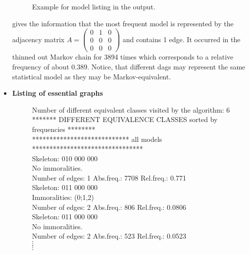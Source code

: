 \begin{itemize}
\begin{figure}
\begin{center}
\end{center}
{\em\caption{\label{output} Example for model listing in the
output.}}
\end{figure}
%
gives the information that the most frequent model is represented
by the adjacency matrix $ A = \left( \begin{array} {cccc}
0&1&0   \\
0&0&0   \\
0&0&0
\end{array}
\right )$ and contains 1 edge. It occurred in the thinned out
Markov chain for 3894 times which corresponds to a relative
frequency of about 0.389. Notice, that different dags may
represent the same statistical model as they may be
Markov-equivalent.
%
%
\item {\bf\sffamily Listing of essential graphs}\\
\begin{figure}
{\it

Number of different equivalent classes visited by the algorithm: 6 \\[0.5cm]
******* DIFFERENT EQUIVALENCE CLASSES sorted by frequencies  ********\\
**************************** all models ******************************** \\[0.5cm]

Skeleton: 010 000 000\\
No immoralities.\\
Number of edges: 1 \hspace{0.3cm} Abs.freq.: 7708 \hspace{0.3cm} Rel.freq.: 0.771 \\[0.3cm]

Skeleton: 011 000 000 \\
Immoralities: (0;1,2) \\
Number of edges: 2 \hspace{0.3cm} Abs.freq.: 806 \hspace{0.3cm} Rel.freq.: 0.0806 \\[0.3cm]

Skeleton: 011 000 000 \\
No immoralities. \\
Number of edges: 2 \hspace{0.3cm} Abs.freq.: 523 \hspace{0.3cm} Rel.freq.: 0.0523\\

$\vdots$ \\[-0.15cm]
$\vdots$

}
\end{figure}
\end{itemize}
